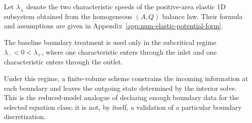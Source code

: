 \begin{definition}
    \label{def:1d-characteristic-speeds}
    Let $\lambda_\pm$ denote the two characteristic speeds of the
    positive-area elastic 1D subsystem obtained from the homogeneous
    $(A,Q)$ balance law. Their formula and assumptions are given in
    Appendix~\ref{app:num-elastic-potential-form}.
\end{definition}

\begin{assumption}
    \label{ass:1d-subcritical-boundary-regime}
    The baseline boundary treatment is used only in the subcritical regime
    $\lambda_-<0<\lambda_+$, where one characteristic enters through the inlet
    and one characteristic enters through the outlet.
\end{assumption}

Under this regime, a finite-volume scheme constrains the incoming information at
each boundary and leaves the outgoing state determined by the interior solve.
This is the reduced-model analogue of declaring enough boundary data for the
selected equation class; it is not, by itself, a validation of a particular
boundary discretization.

